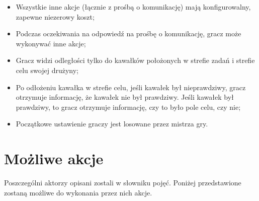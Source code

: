 \documentclass[a4paper]{article}
\begin{document}
\begin{itemize}
\item
  Wszystkie inne akcje (łącznie z prośbą o komunikację) mają konfigurowalny, zapewne niezerowy koszt;
\item
  Podczas oczekiwania na odpowiedź na prośbę o komunikację, gracz może wykonywać inne akcje;
\item
  Gracz widzi odległości tylko do kawałków położonych w strefie zadań i strefie celu swojej drużyny;
\item
  Po odłożeniu kawałka w strefie celu, jeśli kawałek był nieprawdziwy, gracz otrzymuje informację, że kawałek nie był prawdziwy. Jeśli kawałek był prawdziwy, to gracz otrzymuje informację, czy to było pole celu, czy nie;
\item
  Początkowe ustawienie graczy jest losowane przez mistrza gry.
\end{itemize}

\section{Możliwe akcje}

Poszczególni aktorzy opisani zostali w słowniku pojęć.
Poniżej przedstawione zostaną możliwe do wykonania przez nich akcje.

\end{document}

